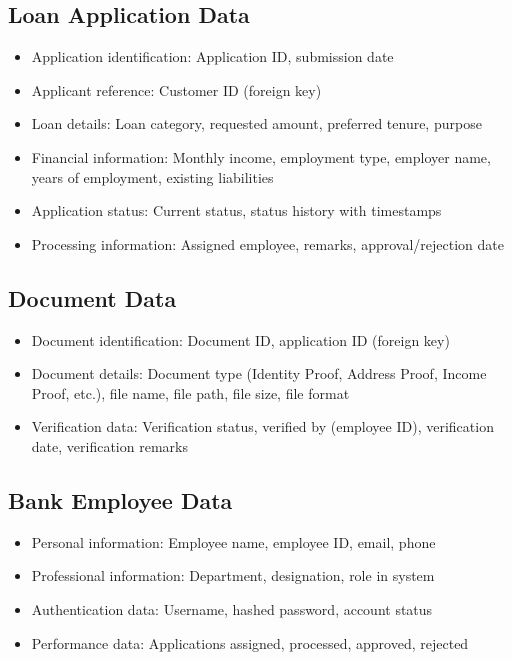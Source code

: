 \documentclass[12pt,a4paper,oneside]{report}
\begin{document}
\subsection{Loan Application Data}

\begin{itemize}
  \item Application identification: Application ID, submission date
  \item Applicant reference: Customer ID (foreign key)
  \item Loan details: Loan category, requested amount, preferred tenure, purpose
  \item Financial information: Monthly income, employment type, employer name, years of employment, existing liabilities
  \item Application status: Current status, status history with timestamps
  \item Processing information: Assigned employee, remarks, approval/rejection date
\end{itemize}

\subsection{Document Data}

\begin{itemize}
  \item Document identification: Document ID, application ID (foreign key)
  \item Document details: Document type (Identity Proof, Address Proof, Income Proof, etc.), file name, file path, file size, file format
  \item Verification data: Verification status, verified by (employee ID), verification date, verification remarks
\end{itemize}

\subsection{Bank Employee Data}

\begin{itemize}
  \item Personal information: Employee name, employee ID, email, phone
  \item Professional information: Department, designation, role in system
  \item Authentication data: Username, hashed password, account status
  \item Performance data: Applications assigned, processed, approved, rejected
\end{itemize}
\end{document}
